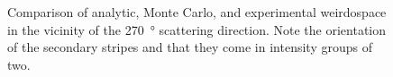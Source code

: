 \begin{figure}
\caption{Comparison of analytic, Monte Carlo, and experimental weirdospace
in the vicinity of the \SI{270}{\degree} scattering direction.  Note the
orientation of the secondary stripes and that they come in intensity groups
of two.}
\label{fig:scat270degree}
\end{figure}

